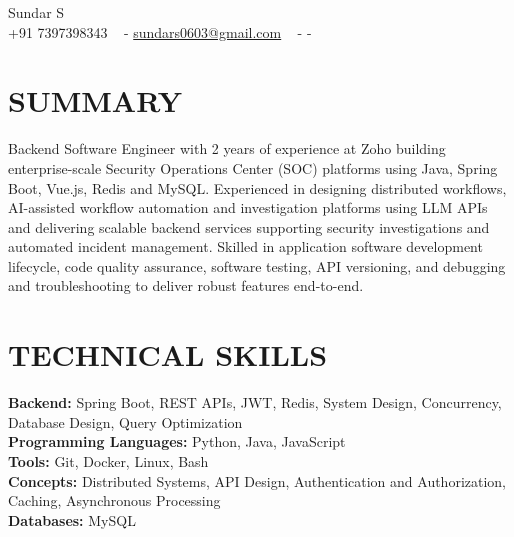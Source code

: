 \documentclass[letterpaper,11pt]{article}
\begin{document}

\vspace{-20px}
\begin{center}
    {\huge Sundar S} \\ \vspace{2pt} 
    +91 7397398343 ~ 
    \small{-}
    \href{mailto:sundars0603@gmail.com}{\color{blue}sundars0603@gmail.com} ~ 
    \small{-}
    \href{https://www.linkedin.com/in/sundar-s-870042235/}{ \color{blue}{LinkedIn}}
    \small{-}
    \href{https://github.com/Sundar0603}{ \color{blue}{GitHub}} ~
    \vspace{-7pt}
\end{center}


\section{\color{airforceblue}SUMMARY} 
Backend Software Engineer with 2 years of experience at Zoho building enterprise-scale Security Operations Center (SOC) platforms using Java, Spring Boot, Vue.js, Redis and MySQL. Experienced in designing distributed workflows, AI-assisted workflow automation and investigation platforms using LLM APIs and delivering scalable backend services supporting security investigations and automated incident management. Skilled in application software development lifecycle, code quality assurance, software testing, API versioning, and debugging and troubleshooting to deliver robust features end-to-end.
\vspace{-10pt}



\section{\color{airforceblue}TECHNICAL SKILLS}
 \begin{itemize}[leftmargin=0in, label={}]
    \small{\item{
      \textbf{\normalsize{Backend:}}{ \normalsize{Spring Boot, REST APIs, JWT, Redis, System Design, Concurrency, Database Design, Query Optimization}} \\
      \textbf{\normalsize{Programming Languages:}}{ \normalsize{Python, Java, JavaScript}} \\
      \textbf{\normalsize{Tools:}}{ \normalsize{Git, Docker, Linux, Bash}} \\
      \textbf{\normalsize{Concepts:}}{ \normalsize{Distributed Systems, API Design, Authentication and Authorization, Caching, Asynchronous Processing}} \\
      \textbf{\normalsize{Databases:}}{ \normalsize{MySQL}} \\
     }}
 \end{itemize}
 \vspace{-16pt}
 
\end{document}
